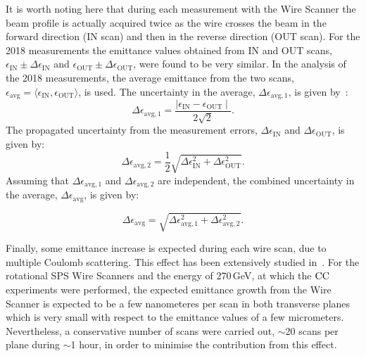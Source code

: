 It is worth noting here that during each measurement with the Wire Scanner the beam profile is actually acquired twice as the wire crosses the beam in the forward direction (IN scan) and then in the reverse direction (OUT scan). For the 2018 measurements the emittance values obtained from IN and OUT scans, $\epsilon_\mathrm{IN} \pm \Delta \epsilon_\mathrm{IN}$ and $\epsilon_\mathrm{OUT} \pm \Delta \epsilon_\mathrm{OUT}$, were found to be very similar. In the analysis of the 2018 measurements, the average emittance from the two scans, $\epsilon_\mathrm{avg} = \langle \epsilon_\mathrm{IN}, \epsilon_\mathrm{OUT}\rangle$, is used. The uncertainty in the average, $\Delta \epsilon_\mathrm{avg, 1}$, is given by~\cite{uncertainty_in_the_mean}: 
\begin{equation}\label{eq:uncertainty_mean_ws}
   \Delta \epsilon_\mathrm{avg, 1} = \frac{\mid \epsilon_\mathrm{IN} - \epsilon_\mathrm{OUT} \mid}{2 \sqrt{2}}.
\end{equation}
The propagated uncertainty from the measurement errors, $\Delta \epsilon_\mathrm{IN}$ and $\Delta \epsilon_\mathrm{OUT}$, is given by:
\begin{equation}\label{eq:propagated_uncertainty_ws}
   \Delta \epsilon_\mathrm{avg, 2} = \frac{1}{2}\sqrt{ \Delta \epsilon_\mathrm{IN}^2 + \Delta \epsilon_\mathrm{OUT}^2}.
\end{equation}
Assuming that $\Delta \epsilon_\mathrm{avg, 1}$ and $\Delta \epsilon_\mathrm{avg, 2}$ are independent, the combined uncertainty in the average, $\Delta \epsilon_\mathrm{avg}$, is given by:

\begin{equation}\label{eq:combined_uncertainty_ws}
   \Delta \epsilon_\mathrm{avg} = \sqrt{\Delta \epsilon_\mathrm{avg, 1} ^2 + \Delta \epsilon_\mathrm{avg, 2} ^2}.
\end{equation}

Finally, some emittance increase is expected during each wire scan, due to multiple Coulomb scattering. This effect has been extensively studied in~\cite{Roncarolo:1481835}. For the rotational SPS Wire Scanners and the energy of 270\,GeV, at which the ${\mathrm{CC}}$ experiments were performed, the expected emittance growth from the Wire Scanner is expected to be a few nanometeres per scan in both transverse planes~\cite{Roncarolo:1481835} which is very small with respect to the emittance values of a few micrometers. Nevertheless, a conservative number of scans were carried out, $\sim$20 scans per plane during $\sim$1 hour, in order to minimise the contribution from this effect.

